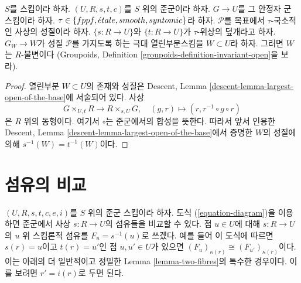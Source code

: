 \begin{lemma}
\label{lemma-property-G-invariant}
$S$를 스킴이라 하자.
$(U, R, s, t, c)$를 $S$ 위의 준군이라 하자.
$G \to U$를 그 안정자 군 스킴이라 하자.
$\tau \in \{fppf, \linebreak[0] \etale, \linebreak[0]
smooth, \linebreak[0] syntomic\}$라 하자.
$\mathcal{P}$를 목표에서 $\tau$-국소적인 사상의 성질이라 하자.
$\{s : R \to U\}$와 $\{t : R \to U\}$가 $\tau$-위상의 덮개라고 하자.
$G_W \to W$가 성질 $\mathcal{P}$를 가지도록 하는 극대 열린부분스킴을
$W \subset U$라 하자. 그러면 $W$는 $R$-불변이다
(Groupoids, Definition
\ref{groupoids-definition-invariant-open}을 보라).
\end{lemma}

\begin{proof}
열린부분 $W \subset U$의 존재와 성질은 Descent, Lemma
\ref{descent-lemma-largest-open-of-the-base}에 서술되어 있다.
사상
$$
G \times_{U, t} R \longrightarrow R \times_{s, U} G, \quad
(g, r) \longmapsto (r, r^{-1} \circ g \circ r)
$$
은 $R$ 위의 동형이다. 여기서 $\circ$는 준군에서의 합성을 뜻한다.
따라서 앞서 인용한 Descent, Lemma
\ref{descent-lemma-largest-open-of-the-base}에서 증명한 $W$의 성질에 의해
$s^{-1}(W) = t^{-1}(W)$이다.
\end{proof}



\section{섬유의 비교}
\label{section-fibres}

\noindent
$(U, R, s, t, c, e, i)$를 $S$ 위의 준군 스킴이라 하자.
도식 (\ref{equation-diagram})을 이용하면 준군에서 사상
$s : R \to U$의 섬유들을 비교할 수 있다. 점 $u \in U$에 대해
$s : R \to U$의 $u$ 위 스킴론적 섬유를 $F_u = s^{-1}(u)$로 쓰겠다.
예를 들어 이 도식에 따르면 $s(r) = u$이고 $t(r) = u'$인 점
$u, u' \in U$가 있으면 $(F_u)_{\kappa(r)} \cong (F_{u'})_{\kappa(r)}$이다.
이는 아래의 더 일반적이고 정밀한 Lemma \ref{lemma-two-fibres}의
특수한 경우이다. 이를 보려면 $r' = i(r)$로 두면 된다.

